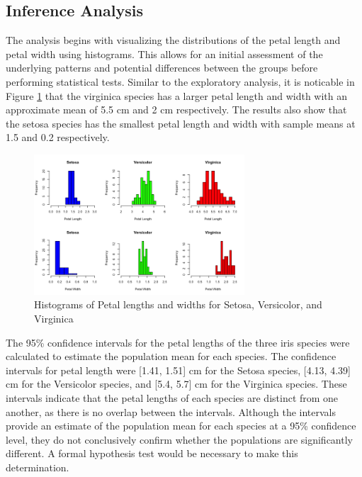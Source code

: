 \documentclass{article}
\begin{document}
\subsection{Inference Analysis}

The analysis begins with visualizing the distributions of the petal length and petal width using histograms. This allows for an initial assessment of the underlying patterns and potential differences between the groups before performing statistical tests. Similar to the exploratory analysis, it is noticable in Figure \ref {fig:hist_iris} that the virginica species has a larger petal length and width with an approximate mean of 5.5 cm and 2 cm respectively. The results also show that the setosa species has the smallest petal length and width with sample means at 1.5 and 0.2 respectively. 

\begin{figure}[H]
	\centering
	\includegraphics[width=0.7\textwidth]{hist_iris.png}
	\caption{Histograms of Petal lengths and widths for Setosa, Versicolor, and
	Virginica}
	\label{fig:hist_iris}
\end{figure}

The 95\% confidence intervals for the petal lengths of the three iris species were calculated to estimate the population mean for each species. The confidence intervals for petal length were [1.41, 1.51] cm for the Setosa species, [4.13, 4.39] cm for the Versicolor species, and [5.4, 5.7] cm for the Virginica species. These intervals indicate that the petal lengths of each species are distinct from one another, as there is no overlap between the intervals. Although the intervals provide an estimate of the population mean for each species at a 95\% confidence level, they do not conclusively confirm whether the populations are significantly different. A formal hypothesis test would be necessary to make this determination.
\end{document}
